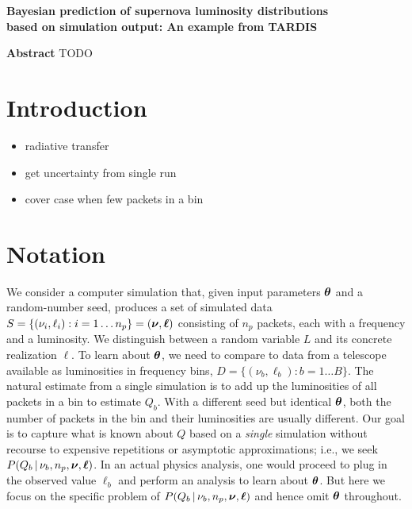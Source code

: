 \documentclass[11pt]{article}
\newcommand{\cond}{\,|\,}
\newcommand{\npack}{n_p}
\newcommand{\Lumtot}{Q}
\newcommand{\tardis}{TARDIS}
\begin{document}
\begin{center}
  \textbf{\Large Bayesian prediction of supernova luminosity  distributions}\\[8pt]
  \textbf{\Large based on simulation output: An example from \tardis}\\[12pt]
\end{center}

\textbf{Abstract} TODO\\

\section{Introduction} \label{sec:intro}

\begin{itemize}
  \item radiative transfer
  \item get uncertainty from single run
  \item cover case when few packets in a bin
\end{itemize}

\section{Notation} \label{sec:notation}

We consider a computer simulation that, given input parameters
${\bm{\theta}}$ and a random-number seed, produces a set of simulated data
$ S = \{ (\nu_i, \ell_i): i=1\dots\npack \} = (\bmnu, \bml)$
consisting of $\npack$ packets, each with a frequency and a
luminosity. We distinguish between a random variable $L$ and its
concrete realization $\ell$.  To learn about ${\bm{\theta}}$, we need to
compare to data from a telescope available as luminosities in
frequency bins, $D = \{ ( \nu_b, \ell_b): b=1 \dots B\}$. The natural
estimate from a single simulation is to add up the luminosities of all
packets in a bin to estimate $\Lumtot_b$.  With a different seed but
identical ${\bm{\theta}}$, both the number of packets in the bin and their
luminosities are usually different. Our goal is to capture what is
known about $\Lumtot$ based on a \emph{single} simulation without recourse
to expensive repetitions or asymptotic approximations; i.e., we seek
$P(\Lumtot_b \cond \nu_b, \npack, \bmnu, \bml )$. In an actual physics
analysis, one would proceed to plug in the observed value $\ell_b$ and
perform an analysis to learn about ${\bm{\theta}}$. But here we focus on
the specific problem of $P(\Lumtot_b \cond \nu_b, \npack, \bmnu, \bml )$ and
hence omit ${\bm{\theta}}$ throughout.
\end{document}
